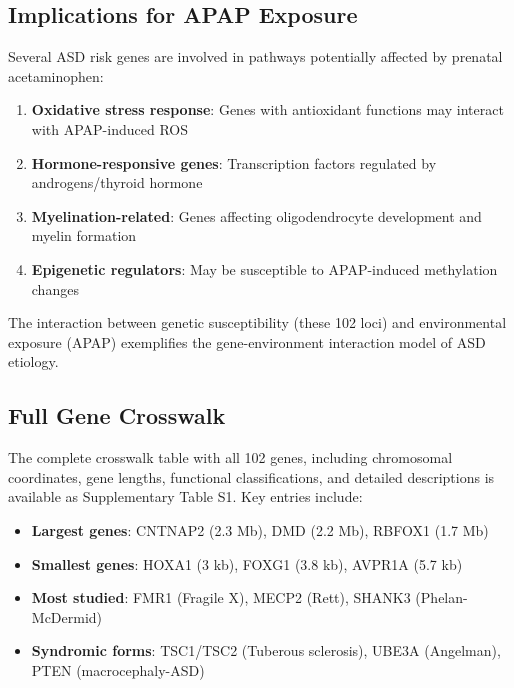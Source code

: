 \documentclass[12pt]{article}
\begin{document}
\subsection{Implications for APAP Exposure}
Several ASD risk genes are involved in pathways potentially affected by prenatal acetaminophen:
\begin{enumerate}
\item \textbf{Oxidative stress response}: Genes with antioxidant functions may interact with APAP-induced ROS
\item \textbf{Hormone-responsive genes}: Transcription factors regulated by androgens/thyroid hormone
\item \textbf{Myelination-related}: Genes affecting oligodendrocyte development and myelin formation
\item \textbf{Epigenetic regulators}: May be susceptible to APAP-induced methylation changes
\end{enumerate}

The interaction between genetic susceptibility (these 102 loci) and environmental exposure (APAP) exemplifies the gene-environment interaction model of ASD etiology.

\subsection{Full Gene Crosswalk}
The complete crosswalk table with all 102 genes, including chromosomal coordinates, gene lengths, functional classifications, and detailed descriptions is available as Supplementary Table S1. Key entries include:

\begin{itemize}
\item \textbf{Largest genes}: CNTNAP2 (2.3 Mb), DMD (2.2 Mb), RBFOX1 (1.7 Mb)
\item \textbf{Smallest genes}: HOXA1 (3 kb), FOXG1 (3.8 kb), AVPR1A (5.7 kb)
\item \textbf{Most studied}: FMR1 (Fragile X), MECP2 (Rett), SHANK3 (Phelan-McDermid)
\item \textbf{Syndromic forms}: TSC1/TSC2 (Tuberous sclerosis), UBE3A (Angelman), PTEN (macrocephaly-ASD)
\end{itemize}
\end{document}
